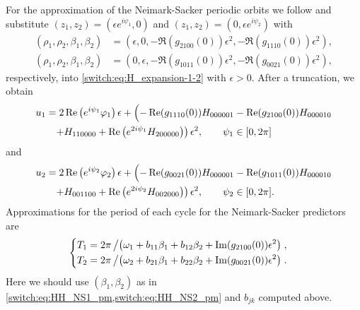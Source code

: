 For the approximation of the Neimark-Sacker periodic orbits we follow \cite{Kuznetsov2008} and substitute $(z_1,z_2)=(\epsilon e^{i\psi_{1}},0)$ and $(z_1,z_2)=(0,\epsilon e^{i\psi_{2}})$ with
\begin{subequations}
\begin{align}
(\rho_{1},\rho_{2},\beta_{1},\beta_{2}) &= \left(\epsilon,0,-\Re(g_{2100}(0))\epsilon^{2},-\Re(g_{1110}(0))\epsilon^{2}\right),\label{switch:eq:HH_NS1_pm}\\
(\rho_{1},\rho_{2},\beta_{1},\beta_{2}) &= \left(0,\epsilon,-\Re(g_{1011}(0))\epsilon^{2},-\Re(g_{0021}(0))\epsilon^{2}\right),\label{switch:eq:HH_NS2_pm}
\end{align}\label{switch:eq:HH_NS_asymptotics}
\end{subequations}
respectively, into \cref{switch:eq:H_expansion-1-2} with $\epsilon>0$. After a truncation, we obtain
\begin{align*}
	u_1 & =2\Re\left(e^{i\psi_{1}}\phi_{1}\right)\epsilon+\Bigl(-\Re(g_{1110}(0))H_{000001}-\Re(g_{2100}(0))H_{000010} \Bigr.\\
	& \phantom{=} \left.+H_{110000}+\Re\left(e^{2i\psi_{1}}H_{200000}\right)\right)\epsilon^{2}, \qquad \psi_1\in[0,2\pi]
\end{align*}
and
\begin{align*}
u_2 & =2\Re\left(e^{i\psi_{2}}\phi_{2}\right)\epsilon+\Bigl(-\Re(g_{0021}(0))H_{000001}-\Re(g_{1011}(0))H_{000010}\Bigr.\\
	& \phantom{=} \left.+H_{001100}+\Re\left(e^{2i\psi_{2}}H_{002000}\right)\right)\epsilon^{2}, \qquad \psi_2\in[0,2\pi].
\end{align*}
Approximations for the period of each cycle for the Neimark-Sacker predictors are
\begin{equation*}
\begin{cases}
\begin{aligned}
T_{1} & =2\pi \left/\left(\omega_{1}+b_{11}\beta_{1}+b_{12}\beta_{2}+\Im(g_{2100}(0))\epsilon^{2}\right)\right.,\\
T_{2} & =2\pi\left/\left(\omega_{2}+b_{21}\beta_{1}+b_{22}\beta_{2}+\Im(g_{0021}(0))\epsilon^{2}\right)\right. .
\end{aligned}
\end{cases}
\label{switch:eq:HH_period_predictors}
\end{equation*}
Here we should use $(\beta_{1},\beta_{2})$ as in \cref{switch:eq:HH_NS1_pm,switch:eq:HH_NS2_pm} and $b_{jk}$ computed above.


